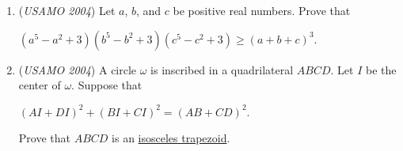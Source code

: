 \begin{enumerate}
 

	\item (\textit{USAMO 2004}) Let $a$, $b$, and $c$ be positive real numbers.  Prove that


 
$(a^5 - a^2 + 3)(b^5 - b^2 + 3)(c^5 - c^2 + 3) \ge (a+b+c)^3$.


 


 

	\item (\textit{USAMO 2004}) A circle $\omega$ is inscribed in a quadrilateral $ABCD$.  Let $I$ be the center of $\omega$.  Suppose that


 
$(AI + DI)^2 + (BI + CI)^2 = (AB + CD)^2$.


 


 Prove that $ABCD$ is an \href{https://artofproblemsolving.com/wiki/index.php?title=Isosceles\_trapezoid}{isosceles trapezoid}.


 

\end{enumerate}